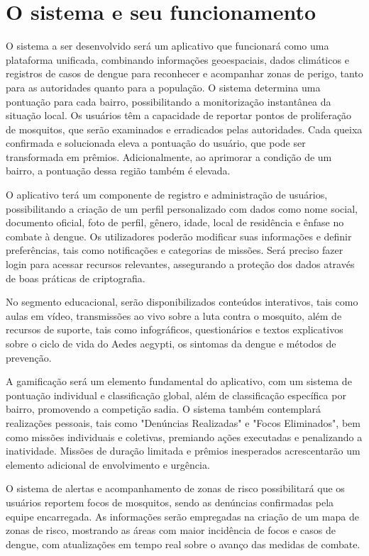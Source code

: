 \documentclass[a5paper, 12pt]{article}
\begin{document}
\section{O sistema e seu funcionamento}

O sistema a ser desenvolvido será  um aplicativo que funcionará como uma plataforma unificada, combinando informações geoespaciais, dados climáticos e registros de casos de dengue para reconhecer e acompanhar zonas de perigo, tanto para as autoridades quanto para a população. O sistema determina uma pontuação para cada bairro, possibilitando a monitorização instantânea da situação local. Os usuários têm a capacidade de reportar pontos de proliferação de mosquitos, que serão examinados e erradicados pelas autoridades. Cada queixa confirmada e solucionada eleva a pontuação do usuário, que pode ser transformada em prêmios. Adicionalmente, ao aprimorar a condição de um bairro, a pontuação dessa região também é elevada.

O aplicativo terá um componente de registro e administração de usuários, possibilitando a criação de um perfil personalizado com dados como nome social, documento oficial, foto de perfil, gênero, idade, local de residência e ênfase no combate à dengue. Os utilizadores poderão modificar suas informações e definir preferências, tais como notificações e categorias de missões. Será preciso fazer login para acessar recursos relevantes, assegurando a proteção dos dados através de boas práticas de criptografia.

No segmento educacional, serão disponibilizados conteúdos interativos, tais como aulas em vídeo, transmissões ao vivo sobre a luta contra o mosquito, além de recursos de suporte, tais como infográficos, questionários e textos explicativos sobre o ciclo de vida do Aedes aegypti, os sintomas da dengue e métodos de prevenção.

A gamificação será um elemento fundamental do aplicativo, com um sistema de pontuação individual e classificação global, além de classificação específica por bairro, promovendo a competição sadia. O sistema também contemplará realizações pessoais, tais como "Denúncias Realizadas" e "Focos Eliminados", bem como missões individuais e coletivas, premiando ações executadas e penalizando a inatividade. Missões de duração limitada e prêmios inesperados acrescentarão um elemento adicional de envolvimento e urgência.

O sistema de alertas e acompanhamento de zonas de risco possibilitará que os usuários reportem focos de mosquitos, sendo as denúncias confirmadas pela equipe encarregada. As informações serão empregadas na criação de um mapa de zonas de risco, mostrando as áreas com maior incidência de focos e casos de dengue, com atualizações em tempo real sobre o avanço das medidas de combate.
\end{document}

